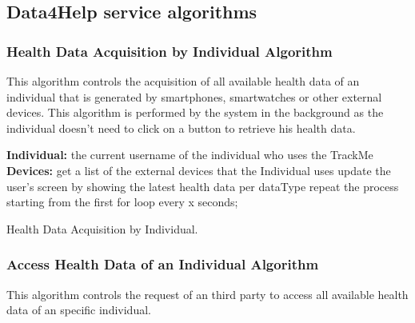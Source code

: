 \documentclass[12pt]{article}
\begin{document}
\subsection{Data4Help service algorithms}

\subsubsection{Health Data Acquisition by Individual Algorithm}

This algorithm controls the acquisition of all available health data of an individual that is generated by 
smartphones, smartwatches or other external devices. This algorithm is performed by the system in the 
background as the individual doesn't need to click on a button to retrieve his health data.
\vspace{10mm}

\begin{algorithm}[H]
 \textbf{Individual:} the current username of the individual who uses the TrackMe\;
 \noindent \textbf{Devices:} get a list of the external devices that the Individual uses\;
 \noindent {}
 \noindent {}
    update the user's screen by showing the latest health data per dataType\;\vspace{1mm}
    repeat the process starting from the first for loop every x seconds;
 \vspace{5mm}
 \caption{Health Data Acquisition by Individual.}
\end{algorithm}

\newpage
\subsubsection{Access Health Data of an Individual Algorithm}

This algorithm controls the request of an third party to access all available health data of an 
specific individual.
\vspace{10mm}
\end{document}
